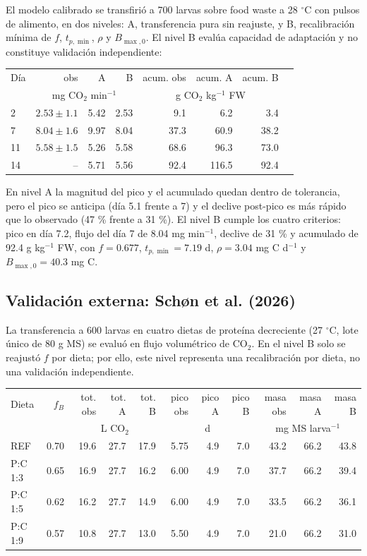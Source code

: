 El modelo calibrado se transfirió a 700 larvas sobre food waste a 28 $^{\circ}$C con pulsos de alimento, en dos niveles: A, transferencia pura sin reajuste, y B, recalibración mínima de $f$, $t_{p,\min}$, $\rho$ y $B_{\max,0}$. El nivel B evalúa capacidad de adaptación y no constituye validación independiente:

\begin{center}
\begin{tabular}{lrrrrrrr}
\toprule
Día & obs & A & B & acum. obs & acum. A & acum. B \\
 & \multicolumn{3}{c}{mg CO$_2$ min$^{-1}$} & \multicolumn{3}{c}{g CO$_2$ kg$^{-1}$ FW} \\
\midrule
2 & $2.53 \pm 1.1$ & 5.42 & 2.53 & 9.1 & 6.2 & 3.4 \\
7 & $8.04 \pm 1.6$ & 9.97 & 8.04 & 37.3 & 60.9 & 38.2 \\
11 & $5.58 \pm 1.5$ & 5.26 & 5.58 & 68.6 & 96.3 & 73.0 \\
14 & -- & 5.71 & 5.56 & 92.4 & 116.5 & 92.4 \\
\bottomrule
\end{tabular}
\end{center}

En nivel A la magnitud del pico y el acumulado quedan dentro de tolerancia, pero el pico se anticipa (día 5.1 frente a 7) y el declive post-pico es más rápido que lo observado (47 \% frente a 31 \%). El nivel B cumple los cuatro criterios: pico en día 7.2, flujo del día 7 de 8.04 mg min$^{-1}$, declive de 31 \% y acumulado de 92.4 g kg$^{-1}$ FW, con $f = 0.677$, $t_{p,\min} = 7.19$ d, $\rho = 3.04$ mg C d$^{-1}$ y $B_{\max,0} = 40.3$ mg C.

\subsection{Validación externa: Schøn et al. (2026)}

La transferencia a 600 larvas en cuatro dietas de proteína decreciente (27 $^{\circ}$C, lote único de 80 g MS) se evaluó en flujo volumétrico de CO$_2$. En el nivel B solo se reajustó $f$ por dieta; por ello, este nivel representa una recalibración por dieta, no una validación independiente.

\begin{center}
\begin{tabular}{lrrrrrrrrrr}
\toprule
Dieta & $f_B$ & tot. obs & tot. A & tot. B & pico obs & pico A & pico B & masa obs & masa A & masa B \\
 & & \multicolumn{3}{c}{L CO$_2$} & \multicolumn{3}{c}{d} & \multicolumn{3}{c}{mg MS larva$^{-1}$} \\
\midrule
REF & 0.70 & 19.6 & 27.7 & 17.9 & 5.75 & 4.9 & 7.0 & 43.2 & 66.2 & 43.8 \\
P:C 1:3 & 0.65 & 16.9 & 27.7 & 16.2 & 6.00 & 4.9 & 7.0 & 37.7 & 66.2 & 39.4 \\
P:C 1:5 & 0.62 & 16.2 & 27.7 & 14.9 & 6.00 & 4.9 & 7.0 & 33.5 & 66.2 & 36.1 \\
P:C 1:9 & 0.57 & 10.8 & 27.7 & 13.0 & 5.50 & 4.9 & 7.0 & 21.0 & 66.2 & 31.0 \\
\bottomrule
\end{tabular}
\end{center}

